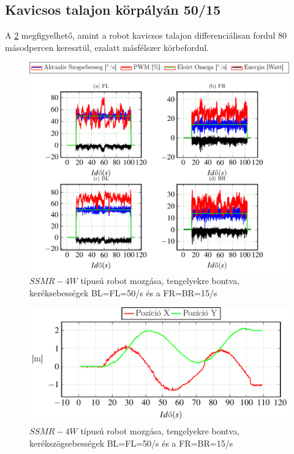 \subsection{Kavicsos talajon körpályán 50/15}
A \ref{fig:KorP0705a} megfigyelhető, amint a robot kavicsos talajon differenciálisan fordul 80 másodpercen keresztül, ezalatt másfélszer körbefordul.

\renewcommand{\GlobalPath}{Meresek/Mozgasok/NormalMukodes/Korpalya_07_05_Kavicsos/}
\renewcommand{\secondImage}{*}

%

%

\begin{figure}[H]
  \includegraphics{tikz/KorP0705x.pdf}
  \caption{$SSMR-4W$ típusú robot mozgása, tengelyekre bontva, keréksebességek BL=FL=50\degree/s és a FR=BR=15\degree/s}
  \label{fig:KorP0705x}  
\end{figure}


\begin{figure}[H]
  \includegraphics{tikz/KorP0705a.pdf}
  \caption{$SSMR-4W$ típusú robot mozgása, tengelyekre bontva, kerékszögsebességek BL=FL=50\degree/s és a FR=BR=15\degree/s}
  \label{fig:KorP0705a}  
\end{figure}


